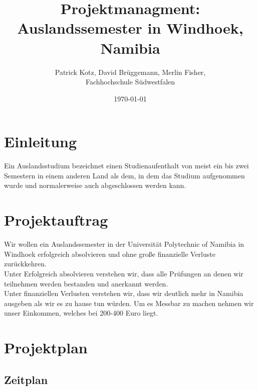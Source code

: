 \documentclass[11pt]{article}
\begin{document}
\begin{titlepage}


\begin{center}

  \title{Projektmanagment: \\Auslandssemester in Windhoek, Namibia}
  \author{Patrick Kotz, David Brüggemann, Merlin Fisher,\\ Fachhochschule Südwestfalen}
  \date{\today}
\end{center}

\end{titlepage}


\maketitle

\tableofcontents
\newpage

\section{Einleitung}
Ein Auslandsstudium bezeichnet einen Studienaufenthalt von meist ein bis zwei Semestern in einem anderen Land als dem, in dem das Studium aufgenommen wurde und normalerweise auch abgeschlossen werden kann.

\section{Projektauftrag}
Wir wollen ein Auslandssemester in der Universität Polytechnic of Namibia in Windhoek erfolgreich absolvieren und ohne große finanzielle Verluste zurückkehren.\\

Unter Erfolgreich absolvieren verstehen wir, dass alle Prüfungen an denen wir teilnehmen werden bestanden und anerkannt werden.\\

Unter finanziellen Verlusten verstehen wir, dass wir deutlich mehr in Namibia ausgeben als wir es zu hause tun würden. Um es Messbar zu machen nehmen wir unser Einkommen, welches bei 200-400 Euro liegt.


\section{Projektplan}



\subsection{Zeitplan}
\end{document}
